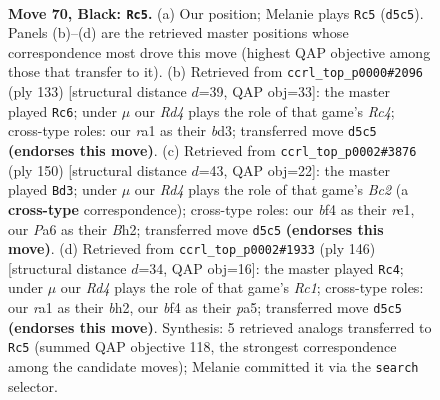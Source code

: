 \documentclass[11pt]{article}
\begin{document}
\clearpage

\begin{figure}[p]\centering
\begin{subfigure}{0.46\textwidth}\centering
\resizebox{\linewidth}{!}{%
\newchessgame
\chessboard[
  setfen={6K1/n1P1k3/p7/P2r1p1p/4pBb1/6P1/8/RN6 b - - 47 70},
  showmover=false,
  pgfstyle=straightmove, color=movearrow, markmove={d5-c5}
]}
\caption{}
\end{subfigure}\hfill
\begin{subfigure}{0.46\textwidth}\centering
\resizebox{\linewidth}{!}{%
\newchessgame
\chessboard[
  setfen={8/5pk1/1p6/p1r3P1/Pb1p2K1/3B4/2P2R2/8 b - - 7 67},
  showmover=false,
  pgfstyle=straightmove, color=movearrow, markmove={c5-c6}
]}
\caption{}
\end{subfigure}
\\[4pt]
\begin{subfigure}{0.46\textwidth}\centering
\resizebox{\linewidth}{!}{%
\newchessgame
\chessboard[
  setfen={2b5/5k2/p5p1/P2P1pP1/2P5/1P3K2/2B4B/4r3 w - - 1 76},
  showmover=false,
  pgfstyle=straightmove, color=movearrow, markmove={c2-d3}
]}
\caption{}
\end{subfigure}\hfill
\begin{subfigure}{0.46\textwidth}\centering
\resizebox{\linewidth}{!}{%
\newchessgame
\chessboard[
  setfen={8/2p3r1/1p2k3/pP6/P2pB3/3P4/4PK1b/2R5 w - - 19 74},
  showmover=false,
  pgfstyle=straightmove, color=movearrow, markmove={c1-c4}
]}
\caption{}
\end{subfigure}
\caption{\textbf{Move 70, Black: \texttt{Rc5}.} (a) Our position; Melanie plays \texttt{Rc5} (\texttt{d5c5}). Panels (b)--(d) are the retrieved master positions whose correspondence most drove this move (highest QAP objective among those that transfer to it). (b) Retrieved from \texttt{ccrl\_top\_p0000\#2096} (ply 133) [structural distance $d$=39, QAP obj=33]: the master played \texttt{Rc6}; under $\mu$ our \emph{Rd4} plays the role of that game's \emph{Rc4}; cross-type roles: our \emph{r}a1 as their \emph{b}d3; transferred move \texttt{d5c5} \textbf{(endorses this move)}. (c) Retrieved from \texttt{ccrl\_top\_p0002\#3876} (ply 150) [structural distance $d$=43, QAP obj=22]: the master played \texttt{Bd3}; under $\mu$ our \emph{Rd4} plays the role of that game's \emph{Bc2} (a \textbf{cross-type} correspondence); cross-type roles: our \emph{b}f4 as their \emph{r}e1, our \emph{P}a6 as their \emph{B}h2; transferred move \texttt{d5c5} \textbf{(endorses this move)}. (d) Retrieved from \texttt{ccrl\_top\_p0002\#1933} (ply 146) [structural distance $d$=34, QAP obj=16]: the master played \texttt{Rc4}; under $\mu$ our \emph{Rd4} plays the role of that game's \emph{Rc1}; cross-type roles: our \emph{r}a1 as their \emph{b}h2, our \emph{b}f4 as their \emph{p}a5; transferred move \texttt{d5c5} \textbf{(endorses this move)}. Synthesis: 5 retrieved analogs transferred to \texttt{Rc5} (summed QAP objective 118, the strongest correspondence among the candidate moves); Melanie committed it via the \texttt{search} selector.}
\label{fig:thought-m139}
\end{figure}
\end{document}
